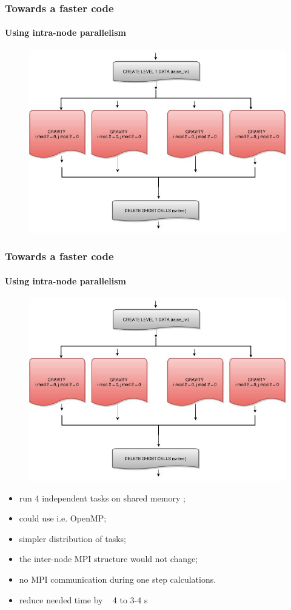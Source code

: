 \documentclass{beamer}
\begin{document}
\begin{frame}
\frametitle{Towards a faster code}
\framesubtitle{Using intra-node parallelism}

\begin{figure}

\includegraphics[width = .8\textwidth]{./Grav_Diagram_para.jpg}

\end{figure}


\end{frame}




\begin{frame}
\frametitle{Towards a faster code}
\framesubtitle{Using intra-node parallelism}

\begin{figure}

\includegraphics[width = .2\textwidth]{./Grav_Diagram_para.jpg}

\end{figure}

\begin{itemize}
\item run 4 independent tasks on shared memory ;
\item could use i.e. OpenMP;
\item simpler distribution of tasks;
\item the inter-node MPI structure would not change;  
\item no MPI communication during one step calculations.
\item reduce needed time by ~ 4 to 3-4 s


\end{itemize}


\end{frame}
\end{document}
